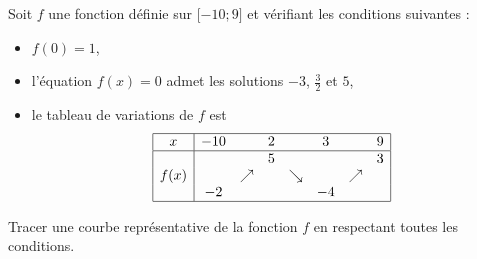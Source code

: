
\begin{exercice}%
    \label{exosmath-0319}

    Soit \( f\) une fonction définie sur \( \mathopen[ -10 ;9 \mathclose]\) et vérifiant les conditions suivantes :
    \begin{itemize}
        \item 
            \( f(0)=1\),
        \item
            l'équation \( f(x)=0\) admet les solutions \( -3\), \( \frac{ 3 }{2}\) et \( 5\),
        \item
            le tableau de variations de \( f\) est
            \begin{equation*}
                \begin{array}[]{|c|ccccccc|}
                    \hline
                    x&-10&&2&&3&&9\\
                    \hline
                    &&&5&&&&3\\
                    f(x)&&\nearrow&&\searrow&&\nearrow&\\
                    &-2&&&&-4&&\\
                    \hline
                \end{array}
            \end{equation*}
            
    \end{itemize}
    Tracer une courbe représentative de la fonction \( f\) en respectant toutes les conditions.

\end{exercice}
